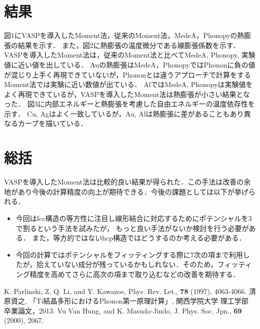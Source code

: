 \documentclass[10pt,twocolumn,a4j]{jsarticle}
\begin{document}
\section{結果}
図1にVASPを導入したMoment法，従来のMoment法，MedeA，Phonopyの熱膨張の結果を示す．
また，図2に熱膨張の温度微分である線膨張係数を示す．
VASPを導入したMoment法は，従来のMoment法と比べてMedeA, Phonopy, 実験値に近い値を出している．
Auの熱膨張はMedeA，PhonopyではPhononに負の値が混じり上手く再現できていないが，Phononとは違うアプローチで計算をするMoment法では実験に近い数値が出ている．
AlではMedeA, Phonopyは実験値をよく再現できているが，VASPを導入したMoment法は熱膨張が小さい結果となった．
図3に内部エネルギーと熱膨張を考慮した自由エネルギーの温度依存性を示す．
Cu, Agはよく一致しているが，Au, Alは熱膨張に差があることもあり異なるカーブを描いている．
\section{総括}
VASPを導入したMoment法は比較的良い結果が得られた．この手法は改善の余地があり今後の計算精度の向上が期待できる．今後の課題としては以下が挙げられる．

\begin{itemize}
\item 今回はfcc構造の等方性に注目し線形結合に対応するためにポテンシャルを3で割るという手法を試みたが，
もっと良い手法がないか検討を行う必要がある．
また，等方的ではないhcp構造ではどうするのか考える必要がある．
\item 今回の計算ではポテンシャルをフィッティングする際に7次の項まで利用したが，拾えていない成分が残っているかもしれない．そのため，フィッティング精度を高めてさらに高次の項まで取り込むなどの改善を期待する．
\end{itemize}


\renewcommand{\bibname}{参考文献}
\begin{thebibliography}{10}
K. Parlinski, Z. Q. Li, and Y. Kawazoe, Phys. Rev. Let., {\bf 78} (1997), 4063-4066.
清原資之, 「Ti結晶多形におけるPhonon第一原理計算」, 関西学院大学 理工学部 卒業論文，2013. 
Vu Van Hung, and K. Masuda-Jindo, J. Phys. Soc. Jpn., {\bf 69} (2000), 2067.
\end{thebibliography}
\end{document}
